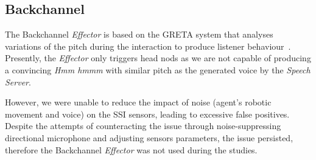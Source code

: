 \subsection{Backchannel}
The Backchannel \textit{Effector} is based on the GRETA system that analyses variations of the pitch during the interaction to produce listener behaviour~\cite{Niewiadomski2009}. Presently, the \textit{Effector} only triggers head nods as we are  not capable of producing a convincing \textit{Hmm hmmm} with similar pitch as the generated voice by the \textit{Speech Server}.

However, we were unable to reduce the impact of noise (agent's robotic movement and voice) on the \ac{SSI} sensors, leading to excessive false positives. Despite the attempts of counteracting the issue through noise-suppressing directional microphone and adjusting sensors parameters, the issue persisted, therefore the Backchannel \textit{Effector} was not used during the studies.



